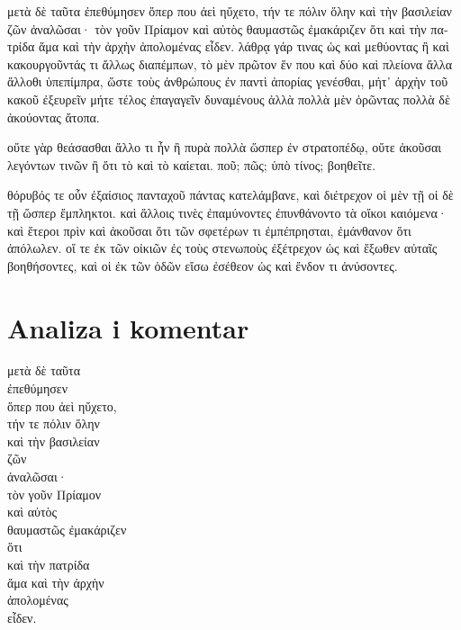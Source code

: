 {\large

\begin{greek}

\noindent μετὰ δὲ ταῦτα ἐπεθύμησεν ὅπερ που ἀεὶ ηὔχετο, τήν τε πόλιν ὅλην καὶ τὴν βασιλείαν ζῶν ἀναλῶσαι· τὸν γοῦν Πρίαμον καὶ αὐτὸς θαυμαστῶς ἐμακάριζεν ὅτι καὶ τὴν πατρίδα ἅμα καὶ τὴν ἀρχὴν ἀπολομένας εἶδεν. λάθρᾳ γάρ τινας ὡς καὶ μεθύοντας ἢ καὶ κακουργοῦντάς τι ἄλλως διαπέμπων, τὸ μὲν πρῶτον ἕν που καὶ δύο καὶ πλείονα ἄλλα ἄλλοθι ὑπεπίμπρα, ὥστε τοὺς ἀνθρώπους ἐν παντὶ ἀπορίας γενέσθαι, μήτ᾽ ἀρχὴν τοῦ κακοῦ ἐξευρεῖν μήτε τέλος ἐπαγαγεῖν δυναμένους ἀλλὰ πολλὰ μὲν ὁρῶντας πολλὰ δὲ ἀκούοντας ἄτοπα. 

\noindent οὔτε γὰρ θεάσασθαι ἄλλο τι ἦν ἢ πυρὰ πολλὰ ὥσπερ ἐν στρατοπέδῳ, οὔτε ἀκοῦσαι λεγόντων τινῶν ἢ ὅτι τὸ καὶ τὸ καίεται. ποῦ; πῶς; ὑπὸ τίνος; βοηθεῖτε.

\noindent θόρυβός τε οὖν ἐξαίσιος πανταχοῦ πάντας κατελάμβανε, καὶ διέτρεχον οἱ μὲν τῇ οἱ δὲ τῇ ὥσπερ ἔμπληκτοι. καὶ ἄλλοις τινὲς ἐπαμύνοντες ἐπυνθάνοντο τὰ οἴκοι καιόμενα· καὶ ἕτεροι πρὶν καὶ ἀκοῦσαι ὅτι τῶν σφετέρων τι ἐμπέπρησται, ἐμάνθανον ὅτι ἀπόλωλεν. οἵ τε ἐκ τῶν οἰκιῶν ἐς τοὺς στενωποὺς ἐξέτρεχον ὡς καὶ ἔξωθεν αὐταῖς βοηθήσοντες, καὶ οἱ ἐκ τῶν ὁδῶν εἴσω ἐσέθεον ὡς καὶ ἔνδον τι ἀνύσοντες.

\end{greek}

}


\section*{Analiza i komentar}


{\large
\begin{greek}
\noindent μετὰ δὲ ταῦτα \\
ἐπεθύμησεν \\
\tabto{2em} ὅπερ που ἀεὶ ηὔχετο, \\

τήν τε πόλιν ὅλην \\
καὶ τὴν βασιλείαν \\
ζῶν \\
\tabto{2em} ἀναλῶσαι· \\
τὸν γοῦν Πρίαμον \\
καὶ αὐτὸς \\
θαυμαστῶς ἐμακάριζεν \\
\tabto{2em} ὅτι \\
\tabto{4em} καὶ τὴν πατρίδα \\
\tabto{4em} ἅμα καὶ τὴν ἀρχὴν \\
\tabto{4em} ἀπολομένας \\
\tabto{4em} εἶδεν. \\

\end{greek}
}

